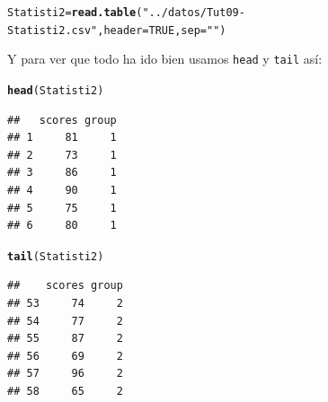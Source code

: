 \documentclass[10pt,a4paper]{article}\usepackage[]{graphicx}\usepackage[]{color}
\makeatletter
\newcommand{\hlnum}[1]{\textcolor[rgb]{0.686,0.059,0.569}{#1}}%
\newcommand{\hlstr}[1]{\textcolor[rgb]{0.192,0.494,0.8}{#1}}%
\newcommand{\hlstd}[1]{\textcolor[rgb]{0.345,0.345,0.345}{#1}}%
\newcommand{\hlkwb}[1]{\textcolor[rgb]{0.69,0.353,0.396}{#1}}%
\newcommand{\hlkwc}[1]{\textcolor[rgb]{0.333,0.667,0.333}{#1}}%
\newcommand{\hlkwd}[1]{\textcolor[rgb]{0.737,0.353,0.396}{\textbf{#1}}}%
\newenvironment{kframe}{%
 \def\at@end@of@kframe{}%
 \ifinner\ifhmode%
  \def\at@end@of@kframe{\end{minipage}}%
  \begin{minipage}{\columnwidth}%
 \fi\fi%
 \def\FrameCommand##1{\hskip\@totalleftmargin \hskip-\fboxsep
 \colorbox{shadecolor}{##1}\hskip-\fboxsep
     \hskip-\linewidth \hskip-\@totalleftmargin \hskip\columnwidth}%
 \MakeFramed {\advance\hsize-\width
   \@totalleftmargin\z@ \linewidth\hsize
   \@setminipage}}%
 {\par\unskip\endMakeFramed%
 \at@end@of@kframe}
\newenvironment{knitrout}{}{} %
\makeatother
\begin{document}
\begin{knitrout}
\color{fgcolor}\begin{kframe}
\begin{alltt}
\hlstd{Statisti2} \hlkwb{=} \hlkwd{read.table}\hlstd{(}\hlstr{"../datos/Tut09-Statisti2.csv"}\hlstd{,} \hlkwc{header} \hlstd{=} \hlnum{TRUE}\hlstd{,} \hlkwc{sep} \hlstd{=} \hlstr{""}\hlstd{)}
\end{alltt}
\end{kframe}
\end{knitrout}
Y  para ver que todo ha ido bien usamos {\tt head} y {\tt tail} así:
\begin{knitrout}
\color{fgcolor}\begin{kframe}
\begin{alltt}
\hlkwd{head}\hlstd{(Statisti2)}
\end{alltt}
\begin{verbatim}
##   scores group
## 1     81     1
## 2     73     1
## 3     86     1
## 4     90     1
## 5     75     1
## 6     80     1
\end{verbatim}
\begin{alltt}
\hlkwd{tail}\hlstd{(Statisti2)}
\end{alltt}
\begin{verbatim}
##    scores group
## 53     74     2
## 54     77     2
## 55     87     2
## 56     69     2
## 57     96     2
## 58     65     2
\end{verbatim}
\end{kframe}
\end{knitrout}
\end{document}
